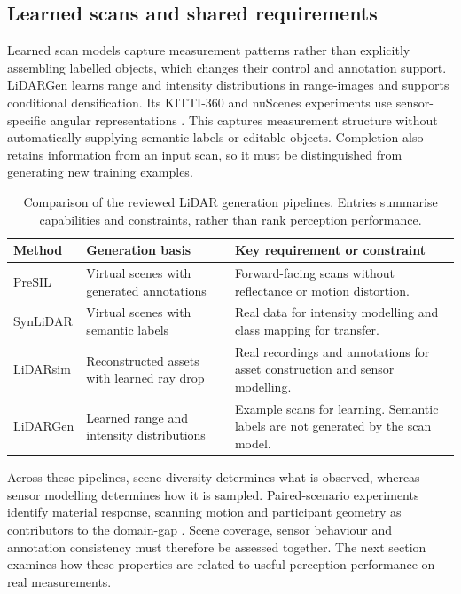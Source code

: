 \subsection{Learned scans and shared requirements}

Learned scan models capture measurement patterns rather than explicitly
assembling labelled objects, which changes their control and annotation support.
LiDARGen learns range and intensity distributions in \glspl{range-image}
and supports conditional \gls{densification}. Its KITTI-360 and nuScenes
experiments use sensor-specific angular representations
\parencite{zyrianovLearningGenerateRealistic2022}.
This captures measurement structure without automatically supplying
semantic labels or editable objects. Completion also retains information
from an input scan, so it must be distinguished from generating new
training examples.

\begin{table}[htbp]
\caption{Comparison of the reviewed LiDAR generation pipelines.
Entries summarise capabilities and constraints, rather than rank
perception performance.}
\label{tab:lidar-generation-comparison}
\small
\begin{tabularx}{\linewidth}{@{}lYY@{}}
\toprule
\textbf{Method} & \textbf{Generation basis} & \textbf{Key requirement or constraint} \\
\midrule
PreSIL \parencite{hurlPreciseSyntheticImage2019}
& Virtual scenes with generated annotations
& Forward-facing scans without reflectance or motion distortion. \\
SynLiDAR \parencite{xiaoTransferLearningSynthetic2022}
& Virtual scenes with semantic labels
& Real data for intensity modelling and class mapping for transfer. \\
LiDARsim \parencite{manivasagamLiDARsimRealisticLiDAR2020}
& Reconstructed assets with learned ray drop
& Real recordings and annotations for asset construction and sensor modelling. \\
LiDARGen \parencite{zyrianovLearningGenerateRealistic2022}
& Learned range and intensity distributions
& Example scans for learning. Semantic labels are not generated by the scan model. \\
\bottomrule
\end{tabularx}
\end{table}

Across these pipelines, scene diversity determines what is observed,
whereas sensor modelling determines how it is sampled. Paired-scenario
experiments identify material response, scanning motion and participant
geometry as contributors to the \gls{domain-gap}
\parencite{manivasagamZeroDomainGap2023}.
Scene coverage, sensor behaviour and annotation consistency must therefore
be assessed together. The next section examines how these properties are
related to useful perception performance on real measurements.
